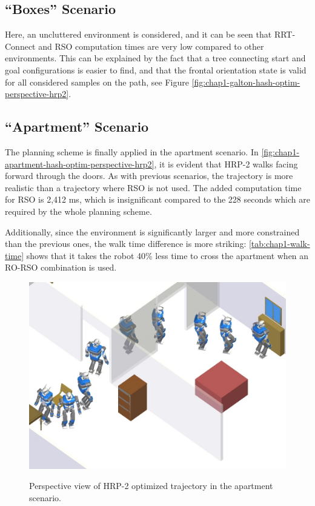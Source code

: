 \subsection{``Boxes'' Scenario}
Here, an uncluttered environment is considered, and it can be seen
that RRT-Connect and RSO computation times are very low compared to
other environments. This can be explained by the fact that a tree
connecting start and goal configurations is easier to find, and that
the frontal orientation state is valid for all considered samples on
the path, see Figure \ref{fig:chap1-galton-hash-optim-perspective-hrp2}.

\subsection{``Apartment'' Scenario}
The planning scheme is finally applied in the apartment scenario. In
\autoref{fig:chap1-apartment-hash-optim-perspective-hrp2}, it is
evident that HRP-2 walks facing forward through the doors. As with
previous scenarios, the trajectory is more realistic than a trajectory
where RSO is not used. The added computation time for RSO is 2,412 ms,
which is insignificant compared to the 228 seconds which are required
by the whole planning scheme.

Additionally, since the environment is significantly larger and more
constrained than the previous ones, the walk time difference is more
striking: \autoref{tab:chap1-walk-time} shows that it takes the robot
40\% less time to cross the apartment when an RO-RSO combination is
used.

\begin{figure}
  \centering
      {\includegraphics[width = 0.8\linewidth]
        {src/chap1-path-optimization/apartment-hash-optim-perspective-hrp2.png}}
      \caption[HRP-2 optimized trajectory in the apartment
        scenario.]{Perspective view of HRP-2 optimized trajectory in
        the apartment scenario.}
      \label{fig:chap1-apartment-hash-optim-perspective-hrp2}
\end{figure}

